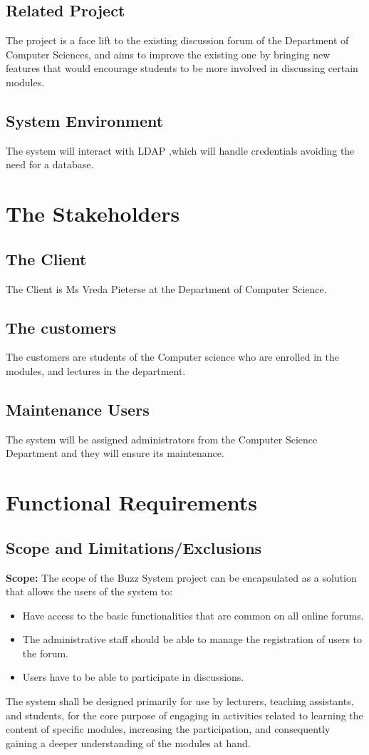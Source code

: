 \documentclass[11pt]{article}
\begin{document}
\subsection{Related Project}
The project is a face lift to the existing discussion forum of the Department of Computer Sciences, and aims to improve the existing one by bringing new features that would encourage students to be more involved in discussing certain modules.
\subsection{System Environment}
The system will interact with LDAP ,which will handle credentials avoiding the need for a database.

\section{The Stakeholders}

\subsection{The Client}
The Client is Ms Vreda Pieterse at the Department of Computer Science.
\subsection{The customers}
The customers are students of the Computer science who are enrolled in the modules, and lectures in the department.
\subsection{Maintenance Users}
The system will be assigned administrators from the Computer Science Department and they will ensure its maintenance.

\newpage
\section{Functional Requirements}
\subsection{Scope and Limitations/Exclusions}
\textbf{Scope: } \newline
The scope of the Buzz System project can be encapsulated as a solution that allows the users of the system to:
\begin{itemize}
\item Have access to the basic functionalities that are common on all online forums.
\item The administrative staff should be able to manage the registration of users to the forum.
\item Users have to be able to participate in discussions. 
\end{itemize}
The system shall be designed primarily for use by lecturers, teaching
assistants, and students, for the core purpose of engaging in activities related to learning the content of specific modules, increasing the participation, and consequently gaining a deeper understanding of the modules at hand. \newline
\end{document}

